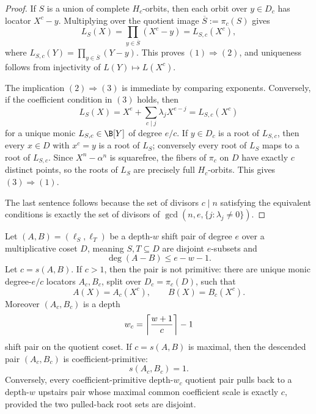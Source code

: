 \begin{proof}
If \(S\) is a union of complete \(H_c\)-orbits, then each orbit over
\(y\in D_c\) has locator \(X^c-y\).  Multiplying over the quotient image
\(\overline S:=\pi_c(S)\) gives
\[
        L_S(X)=\prod_{y\in\overline S}(X^c-y)=L_{S,c}(X^c),
\]
where \(L_{S,c}(Y)=\prod_{y\in\overline S}(Y-y)\).  This proves
\((1)\Rightarrow(2)\), and uniqueness follows from injectivity of
\(L(Y)\mapsto L(X^c)\).

The implication \((2)\Rightarrow(3)\) is immediate by comparing exponents.
Conversely, if the coefficient condition in \((3)\) holds, then
\[
        L_S(X)=X^e+\sum_{c\mid j}\lambda_jX^{e-j}
              =L_{S,c}(X^c)
\]
for a unique monic \(L_{S,c}\in\B[Y]\) of degree \(e/c\).  If
\(y\in D_c\) is a root of \(L_{S,c}\), then every \(x\in D\) with
\(x^c=y\) is a root of \(L_S\); conversely every root of \(L_S\) maps to a
root of \(L_{S,c}\).  Since \(X^n-\alpha^n\) is squarefree, the fibers of
\(\pi_c\) on \(D\) have exactly \(c\) distinct points, so the roots of
\(L_S\) are precisely full \(H_c\)-orbits.  This gives \((3)\Rightarrow(1)\).

The last sentence follows because the set of divisors \(c\mid n\) satisfying
the equivalent conditions is exactly the set of divisors of
\(\gcd(n,e,\{j:\lambda_j\ne0\})\).
\end{proof}

\begin{theorem}
\label{thm:sp-next-maximal-extraction}
Let \((A,B)=(\ell_S,\ell_T)\) be a depth-\(w\) shift pair of degree \(e\)
over a multiplicative coset \(D\), meaning \(S,T\subseteq D\) are disjoint
\(e\)-subsets and
\[
        \deg(A-B)\le e-w-1 .
\]
Let \(c=s(A,B)\).  If \(c>1\), then the pair is not primitive: there are
unique monic degree-\(e/c\) locators \(A_c,B_c\), split over \(D_c=\pi_c(D)\),
such that
\[
        A(X)=A_c(X^c),\qquad B(X)=B_c(X^c).
\]
Moreover \((A_c,B_c)\) is a depth
\[
        w_c=\left\lceil {w+1\over c}\right\rceil-1
\]
shift pair on the quotient coset.  If \(c=s(A,B)\) is maximal, then the
descended pair \((A_c,B_c)\) is coefficient-primitive:
\[
        s(A_c,B_c)=1.
\]
Conversely, every coefficient-primitive depth-\(w_c\) quotient pair pulls
back to a depth-\(w\) upstairs pair whose maximal common coefficient scale is
exactly \(c\), provided the two pulled-back root sets are disjoint.
\end{theorem}

